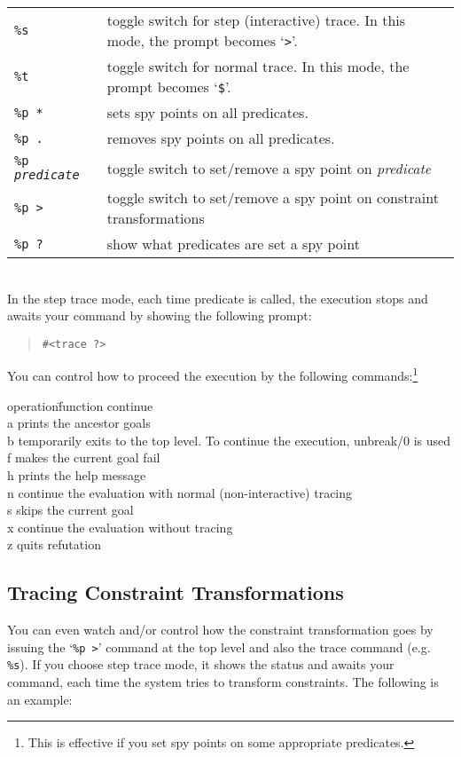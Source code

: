 \begin{tabular}{ll}
{\tt \%s} & toggle switch for step (interactive) trace.
        In this mode, the prompt becomes `\verb+>+'.\\
{\tt \%t} & toggle switch for normal trace.
        In this mode, the prompt becomes  `\verb+$+'.\\
{\tt \%p *} & sets spy points on all predicates. \\
{\tt \%p .} & removes spy points on all predicates. \\
{\tt \%p {\em predicate}} & 
	toggle switch to set/remove a spy point on {\em predicate}\\
{\tt \%p > } & toggle switch to set/remove a spy point on constraint
transformations\\ 
{\tt \%p ?} & show what predicates are set a spy point
\end{tabular}\\
In the step trace mode, each time predicate is  called, the
execution stops and awaits your command by showing the following prompt:
\begin{quote}
        {\tt \#<trace ?>}
\end{quote}
You can control how to proceed the execution by the
following commands:\footnote{This is effective if you set spy points on
some appropriate predicates.}

\begin{tabbing}
operation\=function \kill
[CR] \> continue\\
a \> prints the ancestor goals\\
b \> temporarily exits to the top level. To continue the execution, unbreak/0 is used\\
f \> makes the current goal fail\\
h \> prints the help message\\
n \> continue the evaluation with normal (non-interactive) tracing\\
s \> skips the current goal\\
x \> continue the evaluation without tracing\\
z \> quits refutation\\
\end{tabbing}

\subsection{Tracing Constraint Transformations}
You can even watch and/or control how the constraint transformation
goes by issuing the `{\tt \%p >}' command at the top level and also
the trace command (e.g. {\tt \%s}).
If you choose step trace mode, it shows the status and awaits your
command, each time the system tries to transform constraints.
The following is an example:

